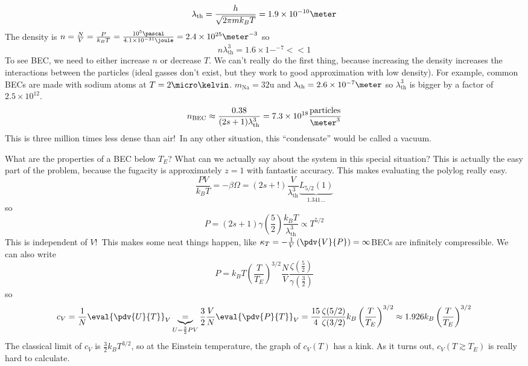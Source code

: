 \documentclass[a4paper,twoside,master.tex]{subfiles}
\begin{document}
\begin{equation}
    \lambda_{\text{th}} = \frac{h}{\sqrt{2 \pi m k_B T}} = 1.9 \times 10^{-10} \meter
\end{equation}
The density is $ n = \frac{N}{V} = \frac{P}{k_B T} = \frac{10^5 \pascal}{4.1 \times 10^{-31} \joule} = 2.4 \times 10^{25} \meter^{-3} $ so
\begin{equation}
    n \lambda_{\text{th}}^3 = 1.6 \times 1-^{-7} << 1
\end{equation}
To see BEC, we need to either increase $ n $ or decrease $ T $. We can't really do the first thing, because increasing the density increases the interactions between the particles (ideal gasses don't exist, but they work to good approximation with low density). For example, common BECs are made with sodium atoms at $ T = 2 \micro\kelvin $. $ m_{\text{Na}} = 32\text{u} $ and $ \lambda_{\text{th}} = 2.6 \times 10^{-7} \meter $ so $ \lambda_{\text{th}}^3 $ is bigger by a factor of $ 2.5 \times 10^{12} $.
\begin{equation}
    n_{\text{BEC}} \approx \frac{0.38}{(2s+1) \lambda_{\text{th}}^3} = 7.3 \times 10^{18} \frac{\text{particles}}{\meter^3}
\end{equation}
This is three million times less dense than air!\ In any other situation, this ``condensate'' would be called a vacuum.


What are the properties of a BEC below $ T_E $? What can we actually say about the system in this special situation? This is actually the easy part of the problem, because the fugacity is approximately $ z = 1 $ with fantastic accuracy. This makes evaluating the polylog really easy.
\begin{equation}
    \frac{PV}{k_BT} = - \beta \Omega = (2s+!) \frac{V}{\lambda_{\text{th}}^3} \underbrace{L_{5/2}(1)}_{1.341\ldots}
\end{equation}
so
\begin{equation}
    P = (2s+1) \gamma \left( \frac{5}{2} \right) \frac{k_B T}{\lambda_{\text{th}}^3} \propto T^{5/2}
\end{equation}
This is independent of $ V $!\ This makes some neat things happen, like $ \kappa_T = - \frac{1}{V} \left( \pdv{V}{P} \right) = \infty $\textemdash BECs are infinitely compressible. We can also write
\begin{equation}
    P = k_B T \left( \frac{T}{T_E} \right)^{3/2} \frac{N}{V} \frac{\zeta \left( \frac{5}{2} \right)}{\gamma \left( \frac{3}{2} \right)}
\end{equation}
so
\begin{equation}
    c_V = \frac{1}{N} \eval{\pdv{U}{T}}_{V} \underbrace{=}_{U = \frac{3}{2} PV} \frac{3}{2} \frac{V}{N} \eval{\pdv{P}{T}}_{V} = \frac{15}{4} \frac{\zeta(5/2)}{\zeta(3/2)} k_B \left( \frac{T}{T_E} \right)^{3/2} \approx 1.926 k_B \left( \frac{T}{T_E} \right)^{3/2}
\end{equation}
The classical limit of $ c_V $ is $ \frac{3}{2} k_B T^{3/2} $, so at the Einstein temperature, the graph of $ c_V(T) $ has a kink. As it turns out, $ c_V(T \gtrsim T_E) $ is really hard to calculate.
\end{document}
